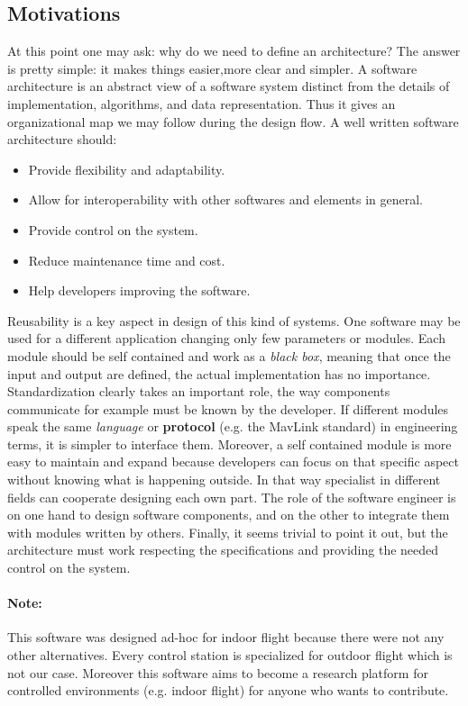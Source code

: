  \subsection{Motivations}
At this point one may ask: why do we need to define an architecture? The answer is pretty simple: it makes things easier,more clear and simpler. A software architecture is an abstract view of a software system distinct from the details of implementation, algorithms, and data representation. Thus it gives an organizational map we may follow during the design flow. A well written software architecture should:
 \begin{itemize}
 \item Provide flexibility and adaptability.
 \item Allow for interoperability with other softwares and elements in general.
 \item Provide control on the system.
 \item Reduce maintenance time and cost.
 \item Help developers improving the software.
 \end{itemize}
Reusability is a key aspect in design of this kind of systems. One software may be used for a different application changing only few parameters or modules. Each module should be self contained and work as a \textit{black box}, meaning that once the input and output are defined, the actual implementation has no importance. Standardization clearly takes an important role, the way components communicate for example must be known by the developer. If different modules speak the same \textit{language} or \textbf{protocol} (e.g. the MavLink standard) in engineering terms, it is simpler to interface them. Moreover, a self contained module is more easy to maintain and expand because developers can focus on that specific aspect without knowing what is happening outside. In that way specialist in different fields can cooperate designing each own part. The role of the software engineer is on one hand to design software components, and on the other to integrate them with modules written by others. Finally, it seems trivial to point it out, but the architecture must work respecting the specifications and providing the needed control on the system. 

\paragraph{Note:}This software was designed ad-hoc for indoor flight because there were not any other alternatives. Every control station is specialized for outdoor flight which is not our case. Moreover this software aims to become a research platform for controlled environments (e.g. indoor flight) for anyone who wants to contribute.
